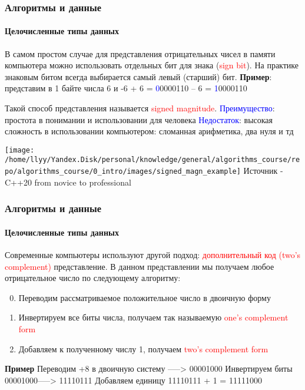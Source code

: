 \documentclass[aspectratio=169]{beamer}
\begin{document}
\begin{frame}
\frametitle{Алгоритмы и данные}
\framesubtitle{Целочисленные типы данных}
\justifying
\small
В самом простом случае для представления отрицательных чисел в памяти компьютера можно использовать отдельных бит для знака (\textcolor{red}{sign bit}). На практике знаковым битом всегда выбирается самый левый (старший) бит.\newline\newline
\textbf{Пример}: представим в 1 байте числа 6 и -6\newline
+ 6  = \textcolor{blue}{0}0000110\newline
– 6  = \textcolor{blue}{1}0000110

Такой способ представления называется \textcolor{red}{signed magnitude}.\newline
\textcolor{blue}{Преимущество}: простота в понимании и использовании для человека\newline  
\textcolor{blue}{Недостаток}: высокая сложность в использовании компьютером: сломанная арифметика, два нуля и тд

\centering
\texttt{[image: /home/llyy/Yandex.Disk/personal/knowledge/general/algorithms\_course/repo/algorithms\_course/0\_intro/images/signed\_magn\_example]}\newline
\centering
\tiny Источник - C++20 from novice to professional
\end{frame}

\begin{frame}
\frametitle{Алгоритмы и данные}
\framesubtitle{Целочисленные типы данных}
\justifying
\small
Современные компьютеры используют другой подход: \textcolor{red}{дополнительный код (two’s complement)} представление.
В данном представлении мы получаем любое отрицательное число по следующему алгоритму:
\begin{enumerate}
  \setcounter{enumi}{-1}
  \item{Переводим рассматриваемое положительное число в двоичную форму}
  \item{Инвертируем все биты числа, получаем так называемую \textcolor{red}{one’s complement form}}
  \item{Добавляем к полученному числу 1, получаем \textcolor{red}{two’s complement form}}
\end{enumerate}

\textbf{Пример}\newline
Переводим +8 в двоичную систему -----> 00001000\newline
Инвертируем биты 00001000\quad\quad\quad -----> 11110111\newline
Добавляем единицу 11110111 + 1 \quad\quad = 11111000\newline

\end{frame}
\end{document}
